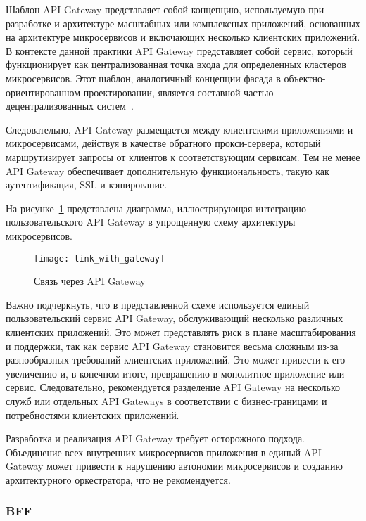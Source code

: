 Шаблон API Gateway представляет собой концепцию, используемую при разработке и архитектуре
масштабных или комплексных приложений, основанных на архитектуре микросервисов и включающих
несколько клиентских приложений.
В контексте данной практики API Gateway представляет собой сервис,
который функционирует как централизованная точка входа для определенных кластеров микросервисов.
Этот шаблон, аналогичный концепции фасада в объектно-ориентированном проектировании, является
составной частью децентрализованных систем~\cite{zhao2018management}.

Следовательно, API Gateway размещается между клиентскими приложениями и микросервисами, действуя в
качестве обратного прокси-сервера, который маршрутизирует запросы от клиентов к соответствующим
сервисам.
Тем не менее API Gateway обеспечивает дополнительную функциональность, такую как
аутентификация, SSL и кэширование.

На рисунке~\ref{fig:link_with_gate} представлена диаграмма, иллюстрирующая интеграцию
пользовательского
API Gateway в упрощенную схему архитектуры микросервисов.

\begin{figure}[htbp]
    \centering
    \texttt{[image: link\_with\_gateway]}
    \caption{Связь через API Gateway}
    \label{fig:link_with_gate}
\end{figure}

Важно подчеркнуть, что в представленной схеме используется единый пользовательский сервис API
Gateway, обслуживающий несколько различных клиентских приложений.
Это может представлять риск в
плане масштабирования и поддержки, так как сервис API Gateway становится весьма сложным из-за
разнообразных требований клиентских приложений.
Это может привести к его увеличению и, в конечном
итоге, превращению в монолитное приложение или сервис.
Следовательно, рекомендуется разделение API
Gateway на несколько служб или отдельных API Gateways в соответствии с бизнес-границами и
потребностями клиентских приложений.

Разработка и реализация API Gateway требует осторожного подхода.
Объединение всех внутренних
микросервисов приложения в единый API Gateway может привести к нарушению автономии микросервисов и
созданию архитектурного оркестратора, что не рекомендуется.

\subsubsection{BFF}

